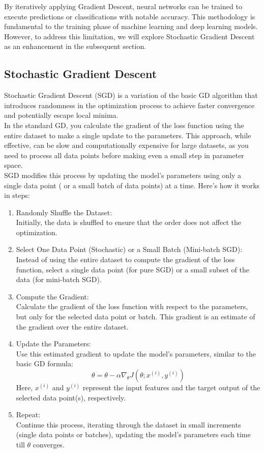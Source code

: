 \documentclass[journal]{IEEEtran}
\begin{document}
By iteratively applying Gradient Descent, neural networks can be trained to execute predictions or classifications with notable accuracy. This methodology is fundamental to the training phase of machine learning and deep learning models. However, to address this limitation, we will explore Stochastic Gradient Descent as an enhancement in the subsequent section.


\subsection{Stochastic Gradient Descent}
Stochastic Gradient Descent (SGD) is a variation of the basic GD algorithm that introduces randomness in the optimization process to achieve faster convergence and potentially escape local minima.\\
In the standard GD, you calculate the gradient of the loss function using the entire dataset to make a single update to the parameters. This approach, while effective, can be slow and computationally expensive for large datasets, as you need to process all data points before making even a small step in parameter space.\\
SGD modifies this process by updating the model's parameters using only a single data point ( or a small batch of data points) at a time. Here's how it works in steps:
\begin{enumerate}
    \item Randomly Shuffle the Dataset: \\
    Initially, the data is shuffled to ensure that the order does not affect the optimization.
    \item Select One Data Point (Stochastic) or a Small Batch (Mini-batch SGD): \\
    Instead of using the entire dataset to compute the gradient of the loss function, select a single data point (for pure SGD) or a small subset of the data (for mini-batch SGD).
    \item Compute the Gradient: \\
    Calculate the gradient of the loss function with respect to the parameters, but only for the selected data point or batch. This gradient is an estimate of the gradient over the entire dataset.
    \item Update the Parameters: \\
    Use this estimated gradient to update the model's parameters, similar to the basic GD formula:
    \[ \theta = \theta - \alpha \nabla_\theta J(\theta; x^{(i)}, y^{(i)}) \]
    Here, \(x^{(i)}\) and \(y^{(i)}\) represent the input features and the target output of the selected data point(s), respectively.
    \item Repeat: \\
    Continue this process, iterating through the dataset in small increments (single data points or batches), updating the model's parameters each time till $\theta$ converges.
\end{enumerate}
\end{document}
